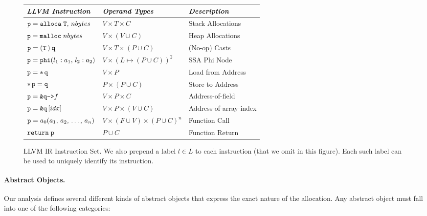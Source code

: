\begin{figure}[t]
  \centering
  \begin{tabular}{l@{\quad}l@{\qquad}l}
    \toprule
    \emph{LLVM Instruction}
    & \emph{Operand Types}
    & \emph{Description} \\
    \midrule
    $\allocainstr{p}{T}{nbytes}$
    & $V \!\times\! T \!\times\! C$
    & Stack Allocations
    \\
    $\mallocinstr{p}{nbytes}$
    & $V \!\times\! (V \cup C)$
    & Heap Allocations
    \\
    $\castinstr{p}{T}{q}$
    & $V \!\times\! T \!\times\! (P \cup C)$
    & (No-op) Casts
    \\
    $\phiinstr{p}{l_1 : a_1}{l_2 : a_2}$
    & $V \!\times\! (L \mapsto (P \cup C))^2$
    & SSA Phi Node
    \\
    $\loadinstr{p}{q}$
    & $V \!\times\! P$
    & Load from Address
    \\
    $\storeinstr{p}{q}$
    & $P \!\times\! (P \cup C)$
    & Store to Address
    \\
    $\fieldaccess{p}{q}{f}$
    & $V \!\times\! P \!\times\! C$
    & Address-of-field
    \\
    $\arrayaccess{p}{q}{idx}$
    & $V \!\times\! P \!\times\! (V \cup C)$
    & Address-of-array-index
    \\
    $\callinstr{p}{a_0}[a_1][a_2,\ldots,a_n]$
    & $V \!\times\! (F \cup V) \!\times\! (P \cup C)^n$
    & Function Call
    \\
    $\returninstr{p}$
    & $P \cup C$
    & Function Return
    \\
    \bottomrule
  \end{tabular}
  \caption[LLVM IR Instruction Set]{%
    LLVM IR Instruction Set. We also prepend a label $l \in L$ to each
    instruction (that we omit in this figure). Each such label can be
    used to uniquely identify its instruction. %
  }
  \label{structsens/fig/llvm}
\end{figure}


\paragraph{Abstract Objects.}
Our analysis defines several different kinds of abstract objects that
express the exact nature of the allocation. Any abstract object must
fall into one of the following categories:

